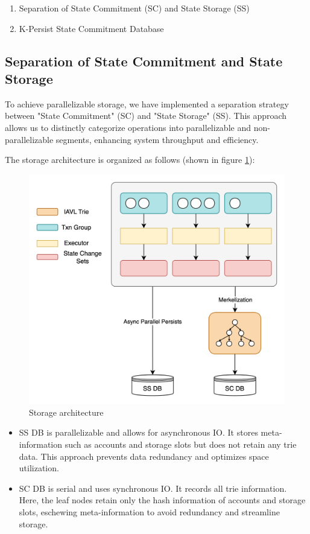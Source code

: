 \begin{enumerate}
    \item Separation of State Commitment (SC) and State Storage (SS)
    \item K-Persist State Commitment Database
\end{enumerate}

\subsection{Separation of State Commitment and State Storage}

To achieve parallelizable storage, we have implemented a separation strategy between "State Commitment" (SC) and "State Storage" (SS). This approach allows us to distinctly categorize operations into parallelizable and non-parallelizable segments, enhancing system throughput and efficiency.

The storage architecture is organized as follows (shown in figure \ref{fig:sc_ss_separation}):

\begin{figure}[htp]
    \centering
    \includegraphics[width=\columnwidth]{sections/images/sc-ss-separation.png}
    \caption{Storage architecture}
    \label{fig:sc_ss_separation}
\end{figure}

\begin{itemize}
    \item SS DB is parallelizable and allows for asynchronous IO. It stores meta-information such as accounts and storage slots but does not retain any trie data. This approach prevents data redundancy and optimizes space utilization.
    \item SC DB is serial and uses synchronous IO. It records all trie information. Here, the leaf nodes retain only the hash information of accounts and storage slots, eschewing meta-information to avoid redundancy and streamline storage.
\end{itemize}

